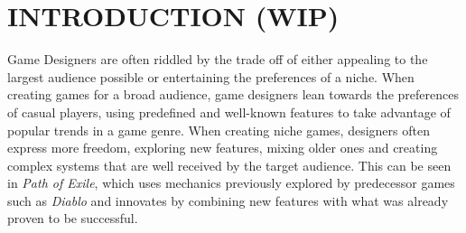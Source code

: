 \chapter{INTRODUCTION (WIP)}













Game Designers are often riddled by the trade off of either appealing to the largest audience possible or entertaining the preferences of a niche. When creating games for a broad audience, game designers lean towards the preferences of casual players, using predefined and well-known features to take advantage of popular trends in a game genre. When creating niche games, designers often express more freedom, exploring new features, mixing older ones and creating complex systems that are well received by the target audience. This can be seen in \emph{Path of Exile}, which uses mechanics previously explored by predecessor games such as \emph{Diablo} and innovates by combining new features with what was already proven to be successful.

